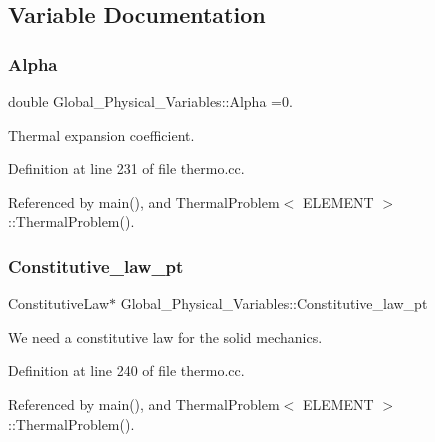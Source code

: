 \subsection{Variable Documentation}
\mbox{\label{namespaceGlobal__Physical__Variables_aa2e802ee7cc8e1ac900ba94c3ce86eb7}} 
\subsubsection{\texorpdfstring{Alpha}{Alpha}}
{\footnotesize\ttfamily double Global\+\_\+\+Physical\+\_\+\+Variables\+::\+Alpha =0.}



Thermal expansion coefficient. 



Definition at line 231 of file thermo.\+cc.



Referenced by main(), and Thermal\+Problem$<$ E\+L\+E\+M\+E\+N\+T $>$\+::\+Thermal\+Problem().

\mbox{\label{namespaceGlobal__Physical__Variables_a2a37fb040c832ee7a086bb13bb02a100}} 
\subsubsection{\texorpdfstring{Constitutive\+\_\+law\+\_\+pt}{Constitutive\_law\_pt}}
{\footnotesize\ttfamily Constitutive\+Law$\ast$ Global\+\_\+\+Physical\+\_\+\+Variables\+::\+Constitutive\+\_\+law\+\_\+pt}



We need a constitutive law for the solid mechanics. 



Definition at line 240 of file thermo.\+cc.



Referenced by main(), and Thermal\+Problem$<$ E\+L\+E\+M\+E\+N\+T $>$\+::\+Thermal\+Problem().

